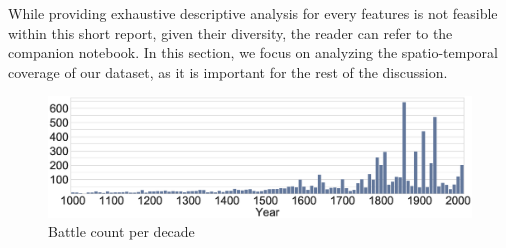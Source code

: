 While providing exhaustive descriptive analysis for every features is not feasible within this short report, given their diversity, the reader can refer to the companion notebook. In this section, we focus on analyzing the spatio-temporal coverage of our dataset, as it is important for the rest of the discussion.

\begin{figure}[!h]
	\centering
	\includegraphics[width=\linewidth]{figures/temporal_coverage.eps}
	\caption{Battle count per decade}
	\label{fig:temporal_coverage}
\end{figure}

